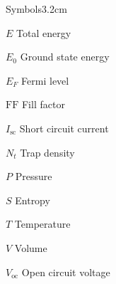 \begin{mclistof}{Symbols}{3.2cm}
\item[$E$] Total energy
\item[$E_0$] Ground state energy
\item[$E_F$] Fermi level
\item[$\textrm{FF}$] Fill factor
\item[$I_\textrm{sc}$] Short circuit current
\item[$N_t$] Trap density
\item[$P$] Pressure
\item[$S$] Entropy
\item[$T$] Temperature
\item[$V$] Volume
\item[$V_\textrm{oc}$] Open circuit voltage


\end{mclistof} 

